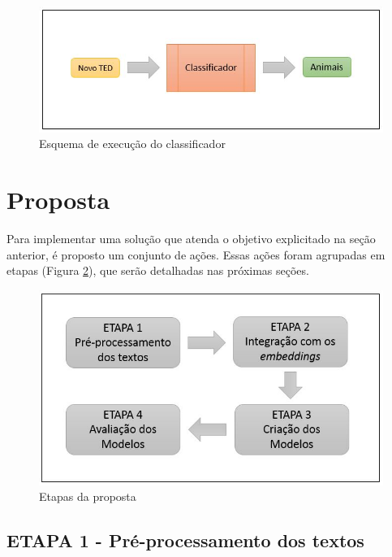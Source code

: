 \documentclass{article}
\begin{document}
\begin{figure}[h!]
\centering
\includegraphics[scale=0.5]{classificacao.JPG}
\caption{Esquema de execução do classificador}
\label{fig:classificacao}
\end{figure}


\section{Proposta}

Para implementar uma solução que atenda o objetivo explicitado na seção anterior, é proposto um conjunto de ações. Essas ações foram agrupadas em etapas (Figura \ref{fig:etapas}), que serão detalhadas nas próximas seções.

\begin{figure}[h!]
\centering
\includegraphics[scale=0.5]{etapas.JPG}
\caption{Etapas da proposta}
\label{fig:etapas}
\end{figure}

\subsection{ETAPA 1 - Pré-processamento dos textos}
\end{document}
